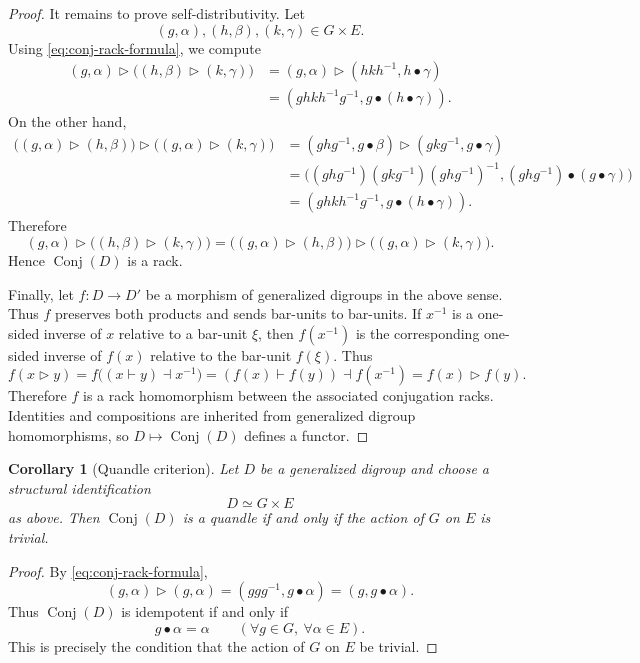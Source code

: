 \documentclass[11pt]{article}
\theoremstyle{plain}
\newtheorem{corollary}[theorem]{Corollary}
\theoremstyle{definition}
\theoremstyle{remark}
\DeclareMathOperator{\Conj}{Conj}
\begin{document}
\begin{proof}
		It remains to prove self-distributivity. Let
		\[
		(g,\alpha),(h,\beta),(k,\gamma)\in G\times E.
		\]
		Using \eqref{eq:conj-rack-formula}, we compute
		\begin{align*}
			(g,\alpha)\triangleright
			\bigl((h,\beta)\triangleright(k,\gamma)\bigr)
			&=
			(g,\alpha)\triangleright(hkh^{-1},h\bullet\gamma)\\
			&=
			(ghkh^{-1}g^{-1},g\bullet(h\bullet\gamma)).
		\end{align*}
		On the other hand,
		\begin{align*}
			\bigl((g,\alpha)\triangleright(h,\beta)\bigr)
			\triangleright
			\bigl((g,\alpha)\triangleright(k,\gamma)\bigr)
			&=
			(ghg^{-1},g\bullet\beta)
			\triangleright
			(gkg^{-1},g\bullet\gamma)\\
			&=
			\bigl((ghg^{-1})(gkg^{-1})(ghg^{-1})^{-1},
			(ghg^{-1})\bullet(g\bullet\gamma)\bigr)\\
			&=
			(ghkh^{-1}g^{-1},g\bullet(h\bullet\gamma)).
		\end{align*}
		Therefore
		\[
		(g,\alpha)\triangleright
		\bigl((h,\beta)\triangleright(k,\gamma)\bigr)
		=
		\bigl((g,\alpha)\triangleright(h,\beta)\bigr)
		\triangleright
		\bigl((g,\alpha)\triangleright(k,\gamma)\bigr).
		\]
		Hence \(\Conj(D)\) is a rack.
		
		Finally, let \(f:D\to D'\) be a morphism of generalized digroups in the above
		sense. Thus \(f\) preserves both products and sends bar-units to bar-units.
		If \(x^{-1}\) is a one-sided inverse of \(x\) relative to a bar-unit \(\xi\),
		then \(f(x^{-1})\) is the corresponding one-sided inverse of \(f(x)\) relative
		to the bar-unit \(f(\xi)\). Thus
		\[
		f(x\triangleright y)
		=
		f\bigl((x\vdash y)\dashv x^{-1}\bigr)
		=
		(f(x)\vdash f(y))\dashv f(x^{-1})
		=
		f(x)\triangleright f(y).
		\]
		Therefore \(f\) is a rack homomorphism between the associated conjugation
		racks. Identities and compositions are inherited from generalized digroup
		homomorphisms, so \(D\mapsto\Conj(D)\) defines a functor.
	\end{proof}
	
	\begin{corollary}[Quandle criterion]\label{cor:quandle-criterion}
		Let \(D\) be a generalized digroup and choose a structural identification
		\[
		D\simeq G\times E
		\]
		as above. Then \(\Conj(D)\) is a quandle if and only if the action of
		\(G\) on \(E\) is trivial.
	\end{corollary}
	
	\begin{proof}
		By \eqref{eq:conj-rack-formula},
		\[
		(g,\alpha)\triangleright(g,\alpha)
		=
		(ggg^{-1},g\bullet\alpha)
		=
		(g,g\bullet\alpha).
		\]
		Thus \(\Conj(D)\) is idempotent if and only if
		\[
		g\bullet\alpha=\alpha
		\qquad
		(\forall g\in G,\ \forall \alpha\in E).
		\]
		This is precisely the condition that the action of \(G\) on \(E\) be
		trivial.
	\end{proof}
	
\end{document}
